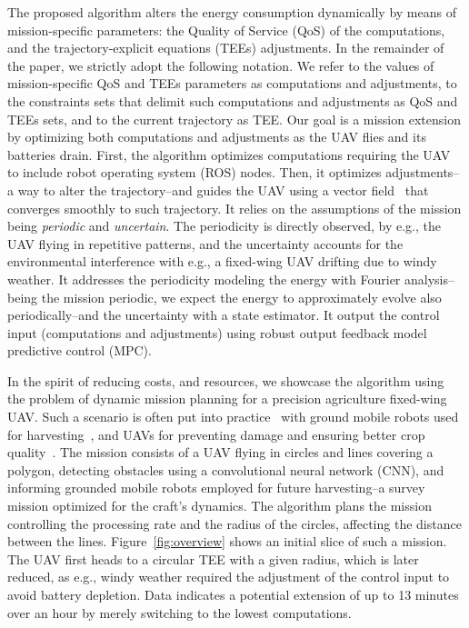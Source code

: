 \documentclass[letterpaper,10pt,conference]{ieeeconf}
\theoremstyle{definition}
\begin{document}
The proposed algorithm alters the energy consumption dynamically by means of mission-specific parameters: the Quality of Service (QoS) of the computations, and the trajectory-explicit equations (TEEs) adjustments. In the remainder of the paper, we strictly adopt the following notation.  We refer to the values of mission-specific QoS and TEEs parameters as computations and adjustments, to the constraints sets that delimit such computations and adjustments as QoS and TEEs sets, and to the current trajectory as TEE. Our goal is a mission extension by optimizing both computations and adjustments as the UAV flies and its batteries drain. First, the algorithm optimizes computations requiring the UAV to include robot operating system (ROS) nodes. Then, it optimizes adjustments--a way to alter the trajectory--and guides the UAV using a vector field~\cite{de2017guidance} that converges smoothly to such trajectory. It relies on the assumptions of the mission being \emph{periodic} and \emph{uncertain}. The periodicity is directly observed, by e.g., the UAV flying in repetitive patterns, and the uncertainty accounts for the environmental interference with e.g., a fixed-wing UAV drifting due to windy weather. It addresses the periodicity modeling the energy with Fourier analysis--being the mission periodic, we expect the energy to approximately evolve also periodically--and the uncertainty with a state estimator. It output the control input (computations and adjustments) using robust output feedback model predictive control (MPC).

In the spirit of reducing costs, and resources, we showcase the algorithm using the problem of dynamic mission planning for a precision agriculture fixed-wing UAV. Such a scenario is often put into practice~\cite{hajjaj2014review} with ground mobile robots used for harvesting~\cite{qingchun2012study,dong2011development, de2011design, aljanobi2010setup, li2008analysis, edan2000robotic}, and UAVs for preventing damage and ensuring better crop quality~\cite{puri2017agriculture, daponte2019review}. The mission consists of a UAV flying in circles and lines covering a polygon, detecting obstacles using a convolutional neural network (CNN), and informing grounded mobile robots employed for future harvesting--a survey mission optimized for the craft's dynamics. The algorithm plans the mission controlling the processing rate and the radius of the circles, affecting the distance between the lines. Figure~\ref{fig:overview} shows an initial slice of such a mission. The UAV first heads to a circular TEE with a given radius, which is later reduced, as e.g., windy weather required the adjustment of the control input to avoid battery depletion. Data indicates a potential extension of up to 13 minutes over an hour by merely switching to the lowest computations.
\end{document}
